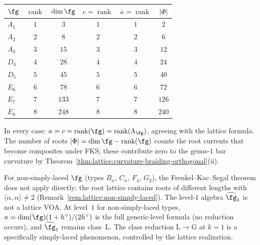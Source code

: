 \begin{computation}%
\label{comp:level1-ade-bridge}%
\begin{center}
\renewcommand{\arraystretch}{1.3}
\begin{tabular}{lccccc}
\toprule
$\fg$ & $\operatorname{rank}$ & $\dim\fg$
 & $c = \operatorname{rank}$
 & $\kappa = \operatorname{rank}$
 & $|\Phi|$ \\
\midrule
$A_1$ & $1$ & $3$ & $1$ & $1$ & $2$ \\
$A_2$ & $2$ & $8$ & $2$ & $2$ & $6$ \\
$A_3$ & $3$ & $15$ & $3$ & $3$ & $12$ \\
$D_4$ & $4$ & $28$ & $4$ & $4$ & $24$ \\
$D_5$ & $5$ & $45$ & $5$ & $5$ & $40$ \\
$E_6$ & $6$ & $78$ & $6$ & $6$ & $72$ \\
$E_7$ & $7$ & $133$ & $7$ & $7$ & $126$ \\
$E_8$ & $8$ & $248$ & $8$ & $8$ & $240$ \\
\bottomrule
\end{tabular}
\end{center}
In every case: $\kappa = c = \operatorname{rank}(\fg) =
\operatorname{rank}(\Lambda_\fg)$, agreeing with the
lattice formula. The number of roots $|\Phi| = \dim\fg -
\operatorname{rank}(\fg)$ counts the root currents that
become composites under FKS; these contribute zero to the
genus-$1$ bar curvature by
Theorem~\ref{thm:lattice:curvature-braiding-orthogonal}(ii).
\end{computation}

\begin{remark}%
\label{rem:level1-non-simply-laced}%
For non-simply-laced $\fg$ (types $B_n$, $C_n$, $F_4$, $G_2$),
the Frenkel--Kac--Segal theorem does not apply directly: the
root lattice contains roots of different lengths with
$\langle\alpha,\alpha\rangle \neq 2$
(Remark~\ref{rem:lattice:non-simply-laced}). The level-$1$
algebra $\widehat{\fg}_1$ is not a lattice VOA.
At level~$1$ for non-simply-laced types,
$\kappa = \dim(\fg)(1+h^\vee)/(2h^\vee)$ is the full
generic-level formula (no reduction occurs), and
$\widehat{\fg}_1$ remains class~L. The class reduction
$\mathrm{L} \to \mathrm{G}$ at $k = 1$ is a specifically
simply-laced phenomenon, controlled by the lattice
realization.
\end{remark}

